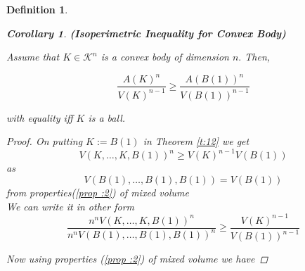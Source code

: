 \documentclass[oneside]{book}
\newtheorem{corollary}{Corollary}[theorem]
\newtheorem{mydef}{Definition}
\begin{document}
\begin{mydef}
\hfill \break
 
 
 
 
 
 
 
 
 
 
 
 
\begin{corollary}\textbf{(Isoperimetric Inequality for Convex Body)}       
 
 
Assume that $K \in \mathcal{K}^{n}$ is a convex body of dimension $n .$ Then,

$$\frac{{A(K)}^n}{{V(K)}^{n-1}} \geq \frac{{A(B(1))}^{n}}{{V(B(1))}^{n-1}} $$

with equality  iff  $K$ is a ball.

 \end{corollary}
 \begin{proof}
     
    
 On putting $K:=B(1)$ in Theorem \ref{t:12} we get 
\[
V(K, \ldots, K, B(1))^{n} \geq V(K)^{n-1} V(B(1))
\]
as $$V(B(1), \ldots, B(1), B(1)) = V(B(1))$$ from properties(\ref{prop :2}) of mixed volume \\

We can write it in other form
\[
\frac{n^{n} V(K, \ldots, K, B(1))^{n}}{n^{n} V(B(1), \ldots, B(1), B(1))^{n}} \geq \frac{V(K)^{n-1}}{V(B(1))^{n-1}}
\]

Now using  properties (\ref{prop :2}) of mixed volume we have


\end{proof}
\end{mydef}
\end{document}
